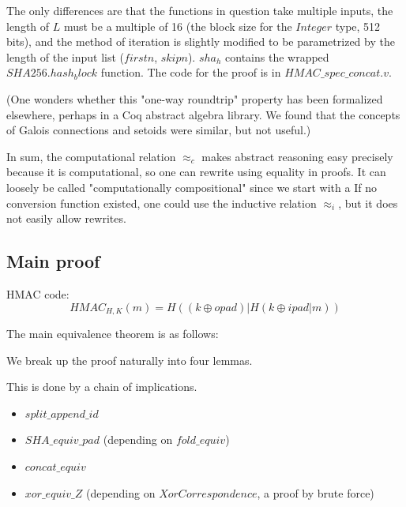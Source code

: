 \documentclass[twocolumn,showpacs,%
  nofootinbib,aps,superscriptaddress,%
  eqsecnum,prd,notitlepage,showkeys,10pt]{revtex4-1}
\begin{document}
The only differences are that the functions in question take multiple inputs, the length of $L$ must be a multiple of 16 (the block size for the $Integer$ type, 512 bits), and the method of iteration is slightly modified to be parametrized by the length of the input list ($firstn$, $skipn$). $sha_h$ contains the wrapped $SHA256.hash_block$ function. The code for the proof is in $HMAC\_spec\_concat.v$.

(One wonders whether this "one-way roundtrip" property has been formalized elsewhere, perhaps in a Coq abstract algebra library. We found that the concepts of Galois connections and setoids were similar, but not useful.)

In sum, the computational relation $\approx_c$ makes abstract reasoning easy precisely because it is computational, so one can rewrite using equality in proofs. It can loosely be called "computationally compositional" since we start with a  If no conversion function existed, one could use the inductive relation $\approx_i$, but it does not easily allow rewrites.

\subsection{Main proof}


HMAC code:
$$HMAC_{H, K}(m) = H ( (k \oplus opad) | H ( k \oplus ipad | m )  ) $$

The main equivalence theorem is as follows:

We break up the proof naturally into four lemmas.

This is done by a chain of implications.

\begin{itemize}
\item $split\_append\_id$
\item $SHA\_equiv\_pad$ (depending on $fold\_equiv$)
\item $concat\_equiv$
\item $xor\_equiv\_Z$ (depending on $XorCorrespondence$, a proof by brute force)
\end{itemize}
\end{document}
